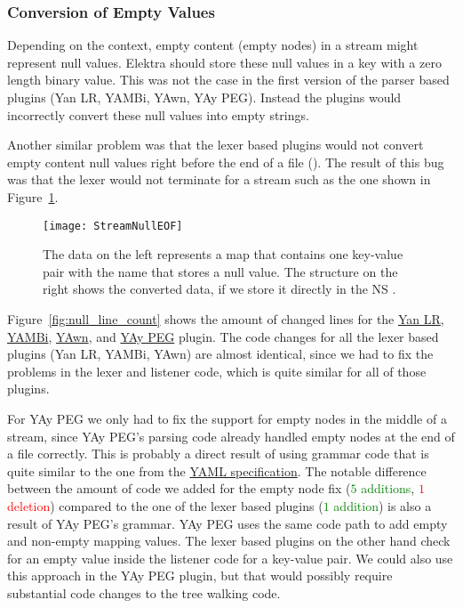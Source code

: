 \subsubsection{Conversion of Empty Values}

Depending on the context, empty content (empty nodes) in a  stream might represent null values. Elektra should store these null values in a key with a zero length binary value. This was not the case in the first version of the parser based  plugins (Yan LR, YAMBi, YAwn, YAy PEG). Instead the plugins would incorrectly convert these null values into empty strings.

Another similar problem was that the lexer based plugins would not convert empty content null values right before the end of a file (). The result of this bug was that the lexer would not terminate for a stream such as the one shown in Figure~\ref{fig:Figures_StreamNullEOF}.

\begin{figure}[H]
  \centering
    \texttt{[image: StreamNullEOF]}
  \caption{The  data on the left represents a map that contains one key-value pair with the name  that stores a null value. The  structure on the right shows the converted  data, if we store it directly in the \gls{NS} .}
  \label{fig:Figures_StreamNullEOF}
\end{figure}

Figure~\ref{fig:null_line_count} shows the amount of changed lines for the \href{https://issues.libelektra.org/2662}{Yan LR}, \href{https://issues.libelektra.org/2663}{YAMBi}, \href{https://issues.libelektra.org/2664}{YAwn}, and \href{https://issues.libelektra.org/2665}{YAy PEG} plugin. The code changes for all the lexer based plugins (Yan LR, YAMBi, YAwn) are almost identical, since we had to fix the problems in the lexer and listener code, which is quite similar for all of those plugins.

For YAy PEG we only had to fix the support for empty nodes in the middle of a  stream, since YAy PEG’s parsing code already handled empty nodes at the end of a file correctly. This is probably a direct result of using grammar code that is quite similar to the one from the \href{http://yaml.org/spec/1.2/spec}{YAML specification}. The notable difference between the amount of code we added for the empty node fix (\textcolor{Green}{$5$ additions}, \textcolor{Red}{$1$ deletion}) compared to the one of the lexer based plugins (\textcolor{Green}{$1$ addition}) is also a result of YAy PEG’s grammar. YAy PEG uses the same code path to add empty and non-empty mapping values. The lexer based plugins on the other hand check for an empty value inside the listener code for a key-value pair. We could also use this approach in the YAy PEG plugin, but that would possibly require substantial code changes to the tree walking code.


